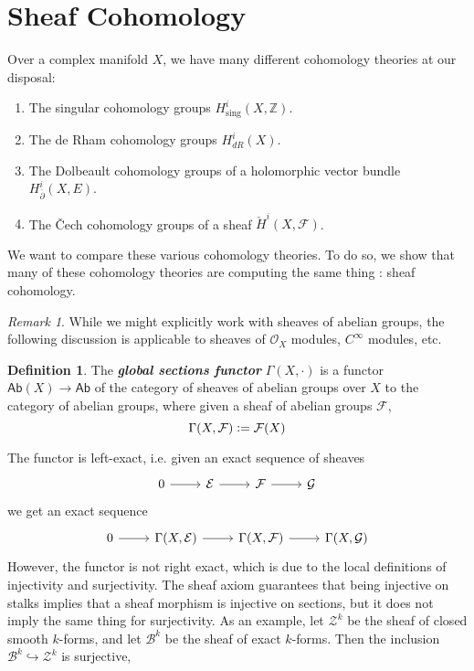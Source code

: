 \documentclass[psamsfonts, 12pt]{amsart}
\theoremstyle{definition}
\newtheorem{defn}[thm]{Definition}
\theoremstyle{remark}
\newtheorem*{rem*}{Remark}
\newcommand{\ib}[1]{\textbf{\textit{#1}}}
\newcommand{\Z}{\mathbb{Z}}
\newcommand{\dbar}{\overline{\partial}}
\newcommand{\defeq}{\vcentcolon=}
\begin{document}
\section{Sheaf Cohomology}
%
Over a complex manifold $X$, we have many different cohomology theories at our disposal:
\begin{enumerate}
  \item The singular cohomology groups $H^i_{\text{sing}}(X,\Z)$.
  \item The de Rham cohomology groups $H^i_{dR}(X)$.
  \item The Dolbeault cohomology groups of a holomorphic vector bundle
  $H^i_{\dbar}(X, E)$.
  \item The \v{C}ech cohomology groups of a sheaf $\check{H}^i(X,\mathcal{F})$.
\end{enumerate}
%
We want to compare these various cohomology theories. To do so, we show that many of
these cohomology theories are computing the same thing : sheaf cohomology.
%
\begin{rem*}
While we might explicitly work with sheaves of abelian groups, the following discussion
is applicable to sheaves of $\mathcal{O}_X$ modules, $C^\infty$ modules, etc.
\end{rem*}
%
\begin{defn}
The \ib{global sections functor} $\Gamma(X,\cdot)$ is a functor
$\mathsf{Ab}(X) \to \mathsf{Ab}$ of the category of sheaves of abelian groups over $X$ to
the category of abelian groups, where given a sheaf of abelian groups $\mathcal{F}$,
\[
\Gamma(X,\mathcal{F}) \defeq \mathcal{F}(X)
\]
\end{defn}
%
The functor is left-exact, i.e. given an exact sequence of sheaves
\[\begin{tikzcd}
0 \ar[r] & \mathcal{E} \ar[r] & \mathcal{F} \ar[r] & \mathcal{G}
\end{tikzcd}\]
we get an exact sequence
\[\begin{tikzcd}
0 \ar[r] & \Gamma(X,\mathcal{E}) \ar[r]
& \Gamma(X,\mathcal{F}) \ar[r] & \Gamma(X,\mathcal{G})
\end{tikzcd}\]
%
However, the functor is not right exact, which is due to the local definitions of
injectivity and surjectivity. The sheaf axiom guarantees that being injective on
stalks implies that a sheaf morphism is injective on sections, but it does not
imply the same thing for surjectivity. As an example, let $\mathcal{Z}^k$ be
the sheaf of closed smooth $k$-forms, and let $\mathcal{B}^k$ be the sheaf of exact
$k$-forms. Then the inclusion $\mathcal{B}^k \hookrightarrow \mathcal{Z}^k$ is surjective,
\end{document}
